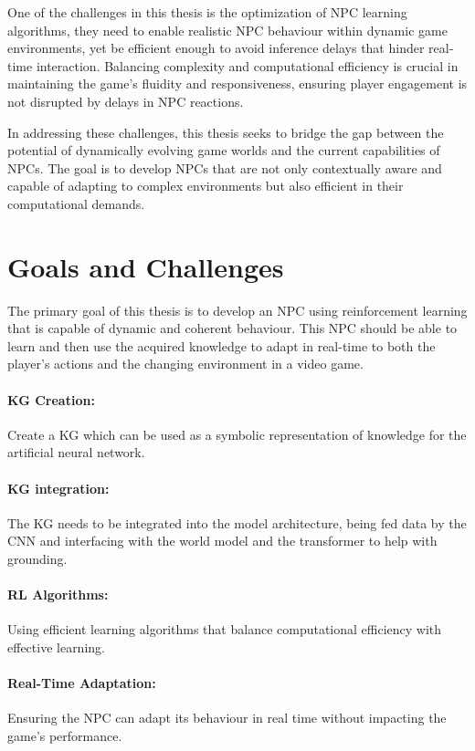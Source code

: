 One of the challenges in this thesis is the optimization of NPC learning algorithms, they need to enable realistic NPC behaviour within dynamic game environments, yet be efficient enough to avoid inference delays that hinder real-time interaction. Balancing complexity and computational efficiency is crucial in maintaining the game's fluidity and responsiveness, ensuring player engagement is not disrupted by delays in NPC reactions.

In addressing these challenges, this thesis seeks to bridge the gap between the potential of dynamically evolving game worlds and the current capabilities of NPCs. The goal is to develop NPCs that are not only contextually aware and capable of adapting to complex environments but also efficient in their computational demands.

\section{Goals and Challenges}

The primary goal of this thesis is to develop an NPC using reinforcement learning that is capable of dynamic and coherent behaviour. This NPC should be able to learn and then use the acquired knowledge to adapt in real-time to both the player's actions and the changing environment in a video game. 
\paragraph{KG Creation:}
Create a KG which can be used as a symbolic representation of knowledge for the artificial neural network.
\paragraph{KG integration:}
The KG needs to be integrated into the model architecture, being fed data by the CNN and interfacing with the world model and the transformer to help with grounding.
\paragraph{RL Algorithms:}
Using efficient learning algorithms that balance computational efficiency with effective learning.
\paragraph{Real-Time Adaptation:}
Ensuring the NPC can adapt its behaviour in real time without impacting the game’s performance.
